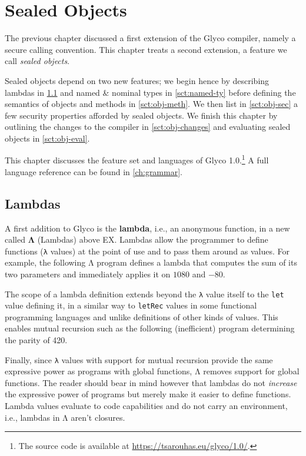 \documentclass[main.tex]{subfiles}
\begin{document}
\onlyinsubfile{\mainmatter{}}

\chapter{Sealed Objects} \label{ch:obj}
The previous chapter discussed a first extension of the Glyco compiler, namely a secure calling convention. This chapter treats a second extension, a feature we call \emph{sealed objects}.

Sealed objects depend on two new features; we begin hence by describing lambdas in \cref{sct:lambda} and named \& nominal types in \cref{sct:named-ty} before defining the semantics of objects and methods in \cref{sct:obj-meth}. We then list in \cref{sct:obj-sec} a few security properties afforded by sealed objects. We finish this chapter by outlining the changes to the compiler in \cref{sct:obj-changes} and evaluating sealed objects in \cref{sct:obj-eval}.

This chapter discusses the feature set and languages of Glyco 1.0.\footnote{The source code is available at \url{https://tsarouhas.eu/glyco/1.0/}.} A full language reference can be found in \cref{ch:grammar}.

\section{Lambdas} \label{sct:lambda}
A first addition to Glyco is the \textbf{lambda}, i.e., an anonymous function, in a new  called \textbf{Λ} (Lambdas) above EX. Lambdas allow the programmer to define functions (\texttt{λ} values) at the point of use and to pass them around as values. For example, the following Λ program defines a lambda that computes the sum of its two parameters and immediately applies it on $1080$ and $-80$.

The scope of a lambda definition extends beyond the \texttt{λ} value itself to the \texttt{let} value defining it, in a similar way to \texttt{letRec} values in some functional programming languages and unlike definitions of other kinds of values. This enables mutual recursion such as the following (inefficient) program determining the parity of 420.

Finally, since \texttt{λ} values with support for mutual recursion provide the same expressive power as programs with global functions, Λ removes support for global functions. The reader should bear in mind however that lambdas do not \emph{increase} the expressive power of programs but merely make it easier to define functions. Lambda values evaluate to code capabilities and do not carry an environment, i.e., lambdas in Λ aren't closures.
\end{document}
